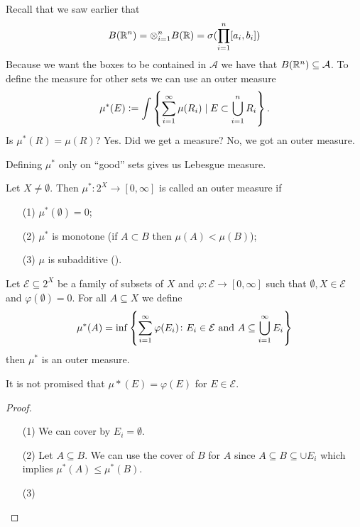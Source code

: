 \documentclass[11pt,a4paper]{article}
\newcommand{\A}{\mathcal A}
\begin{document}
Recall that we saw earlier that
\[
  B(\mathbb{R}^n) =
  \otimes_{i=1}^{n} B(\mathbb{R}) =
  \sigma(\prod_{i=1}^{n} [a_i,b_i])
\]
Because we want the boxes to be contained in $\A$ we have that
$B(\R^n) \subseteq \A$.
To define the measure for other sets we can use an outer measure
\[
  \mu^*(E) := \int \set{\sum_{i=1}^{\infty} \mu(R_i) \mid E \subset 
  \bigcup_{i=1}^{n} R_i}.
\]
Is $\mu^*(R) = \mu(R)$? Yes.
Did we get a measure? No, we got an outer measure.
\begin{remark}
  Defining $\mu^*$ only on ``good'' sets gives us Lebesgue measure.
\end{remark}

\begin{definition}
  Let $X \neq \emptyset$. Then $\mu^* \colon 2^X \to [0,\infty]$ is
  called an outer measure if
  \begin{enumerate}
    \item[(1)] $\mu^*(\emptyset) = 0$;
    \item[(2)] $\mu^*$ is monotone (if $A \subset B$ then $\mu(A) < \mu(B)$);
    \item[(3)] $\mu$ is subadditive ().
  \end{enumerate}
\end{definition}

\begin{proposition}
  Let $\mathcal E \subseteq 2^X$ be a family of subsets of $X$ and
  $\varphi \colon \mathcal E \to [0,\infty]$ such that
  $\emptyset, X \in \mathcal E$ and $\varphi(\emptyset) = 0$.
  For all $A \subseteq X$ we define
  \[
    \mu^*(A) = \inf\set{\sum_{i=1}^{\infty} \varphi(E_i) \colon 
    E_i \in \mathcal E \text{ and }A \subseteq \bigcup_{i=1}^{\infty} E_i}
  \]
  then $\mu^*$ is an outer measure.
\end{proposition}
\begin{remark}
  It is not promised that $\mu*(E) = \varphi(E)$ for $E \in \mathcal E$.
\end{remark}
\begin{proof}
\begin{enumerate}
  \item[(1)] We can cover by $E_i = \emptyset$.
  \item[(2)] Let $A \subseteq B$.
    We can use the cover of $B$ for $A$ since 
    $A \subseteq B \subseteq \cup E_i$ which implies $\mu^*(A) \le \mu^*(B)$.
  \item[(3)]
\end{enumerate}
\end{proof}
\end{document}
